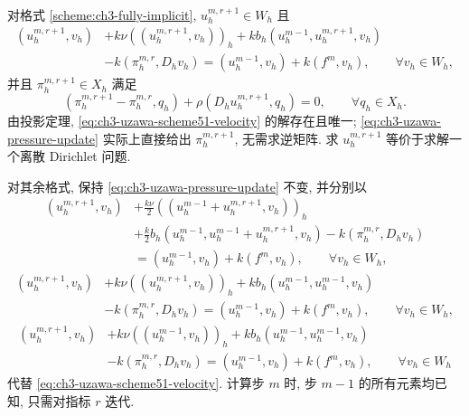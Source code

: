 \hypertarget{chapter-03-page-278}{}
对格式 \ref{scheme:ch3-fully-implicit}, $u_h^{m,r+1}\in W_h$ 且
\begin{equation}
\begin{split}
(u_h^{m,r+1},v_h)&+k\nu((u_h^{m,r+1},v_h))_h
+kb_h(u_h^{m-1},u_h^{m,r+1},v_h)\\
&-k(\pi_h^{m,r},D_hv_h)
=(u_h^{m-1},v_h)+k(f^m,v_h),\qquad\forall v_h\in W_h,
\end{split}
\label{eq:ch3-uzawa-scheme51-velocity}
\end{equation}
并且 $\pi_h^{m,r+1}\in X_h$ 满足
\begin{equation}
(\pi_h^{m,r+1}-\pi_h^{m,r},q_h)+\rho(D_hu_h^{m,r+1},q_h)=0,
\qquad\forall q_h\in X_h.
\label{eq:ch3-uzawa-pressure-update}
\end{equation}
由投影定理, \eqref{eq:ch3-uzawa-scheme51-velocity} 的解存在且唯一; \eqref{eq:ch3-uzawa-pressure-update} 实际上直接给出 $\pi_h^{m,r+1}$, 无需求逆矩阵. 求 $u_h^{m,r+1}$ 等价于求解一个离散 Dirichlet 问题.

对其余格式, 保持 \eqref{eq:ch3-uzawa-pressure-update} 不变, 并分别以
\begin{equation}
\begin{split}
(u_h^{m,r+1},v_h)&+\frac{k\nu}{2}((u_h^{m-1}+u_h^{m,r+1},v_h))_h\\
&+\frac k2b_h(u_h^{m-1},u_h^{m-1}+u_h^{m,r+1},v_h)
-k(\pi_h^{m,r},D_hv_h)\\
&=(u_h^{m-1},v_h)+k(f^m,v_h),\qquad\forall v_h\in W_h,
\end{split}
\label{eq:ch3-uzawa-scheme52-velocity}
\end{equation}
\begin{equation}
\begin{split}
(u_h^{m,r+1},v_h)&+k\nu((u_h^{m,r+1},v_h))_h
+kb_h(u_h^{m-1},u_h^{m-1},v_h)\\
&-k(\pi_h^{m,r},D_hv_h)
=(u_h^{m-1},v_h)+k(f^m,v_h),\qquad\forall v_h\in W_h,
\end{split}
\label{eq:ch3-uzawa-scheme53-velocity}
\end{equation}
\begin{equation}
\begin{split}
(u_h^{m,r+1},v_h)&+k\nu((u_h^{m-1},v_h))_h
+kb_h(u_h^{m-1},u_h^{m-1},v_h)\\
&-k(\pi_h^{m,r},D_hv_h)
=(u_h^{m-1},v_h)+k(f^m,v_h),\qquad\forall v_h\in W_h
\end{split}
\label{eq:ch3-uzawa-scheme54-velocity}
\end{equation}
代替 \eqref{eq:ch3-uzawa-scheme51-velocity}. 计算步 $m$ 时, 步 $m-1$ 的所有元素均已知, 只需对指标 $r$ 迭代.

